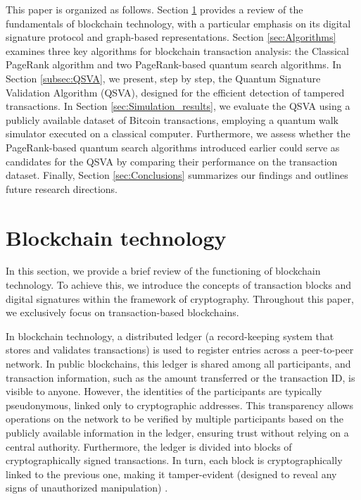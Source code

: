 \documentclass[nofootinbib,aps,prd,reprint,superscriptaddress,floatfix]{revtex4-2}
\begin{document}
This paper is organized as follows. Section \ref{sec:Blockchain} provides a review of the fundamentals of blockchain technology, with a particular emphasis on its digital signature protocol and graph-based representations. Section \ref{sec:Algorithms} examines three key algorithms for blockchain transaction analysis: the Classical PageRank algorithm and two PageRank-based quantum search algorithms. In Section \ref{subsec:QSVA}, we present, step by step, the Quantum Signature Validation Algorithm (QSVA), designed for the efficient detection of tampered transactions. In Section \ref{sec:Simulation_results}, we evaluate the QSVA using a publicly available dataset of Bitcoin transactions, employing a quantum walk simulator executed on a classical computer. Furthermore, we assess whether the PageRank-based quantum search algorithms introduced earlier could serve as candidates for the QSVA by comparing their performance on the transaction dataset. Finally, Section \ref{sec:Conclusions} summarizes our findings and outlines future research directions.

\section{Blockchain technology}\label{sec:Blockchain}

In this section, we provide a brief review of the functioning of blockchain technology. To achieve this, we introduce the concepts of transaction blocks and digital signatures within the framework of cryptography. Throughout this paper, we exclusively focus on transaction-based blockchains. 

In blockchain technology, a distributed ledger (a record-keeping system that stores and validates transactions) is used to register entries across a peer-to-peer network. In public blockchains, this ledger is shared among all participants, and transaction information, such as the amount transferred or the transaction ID, is visible to anyone. However, the identities of the participants are typically pseudonymous, linked only to cryptographic addresses. This transparency allows operations on the network to be verified by multiple participants based on the publicly available information in the ledger, ensuring trust without relying on a central authority. Furthermore, the ledger is divided into blocks of cryptographically signed transactions. In turn, each block is cryptographically linked to the previous one, making it tamper-evident (designed to reveal any signs of unauthorized manipulation) \cite{Blockchain_overview}.
\end{document}

